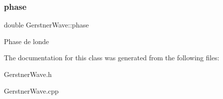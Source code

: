 \subsubsection{\texorpdfstring{phase}{phase}}
{\footnotesize\ttfamily double Gerstner\+Wave\+::phase}

Phase de l\textquotesingle{}onde 

The documentation for this class was generated from the following files\+:\begin{DoxyCompactItemize}
\item 
Gerstner\+Wave.\+h\item 
Gerstner\+Wave.\+cpp\end{DoxyCompactItemize}
